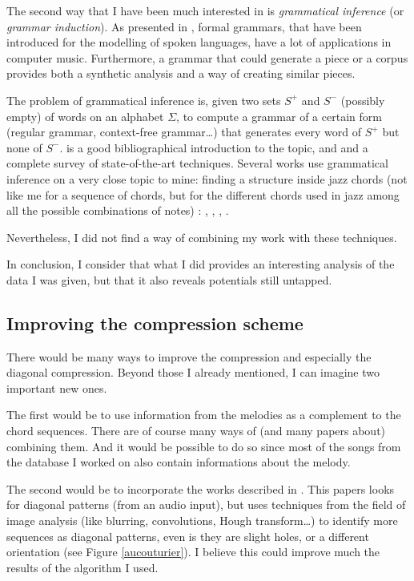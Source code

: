 \documentclass[a4paper,10pt]{article}
\begin{document}
The second way that I have been much interested in is \emph{grammatical inference} (or \emph{grammar induction}). As presented in \cite{goldabdallah}, formal grammars, that have been introduced for the modelling of spoken languages, have a lot of applications in computer music. Furthermore, a grammar that could generate a piece or a corpus provides both a synthetic analysis and a way of creating similar pieces.

The problem of grammatical inference is, given two sets $S^+$ and $S^-$ (possibly empty) of words on an alphabet $\Sigma$, to compute a grammar of a certain form (regular grammar, context-free grammar\dots) that generates every word of $S^+$ but none of $S^-$. \cite{bibliogrammar} is a good bibliographical introduction to the topic, and \cite{survey1} and \cite{survey2} a complete survey of state-of-the-art techniques. Several works use grammatical inference on a very close topic to mine: finding a structure inside jazz chords (not like me for a sequence of chords, but for the different chords used in jazz among all the possible combinations of notes) : \cite{jazzgrammar1}, \cite{jazzgrammar2}, \cite{jazzgrammar3}, \cite{jazzgrammar4}.

Nevertheless, I did not find a way of combining my work with these techniques.

In conclusion, I consider that what I did provides an interesting analysis of the data I was given, but that it also reveals potentials still untapped.


\subsection{Improving the compression scheme}

There would be many ways to improve the compression and especially the diagonal compression. Beyond those I already mentioned, I can imagine two important new ones.

The first would be to use information from the melodies as a complement to the chord sequences. There are of course many ways of (and many papers about) combining them. And it would be possible to do so since most of the songs from the database I worked on also contain informations about the melody.

The second would be to incorporate the works described in \cite{aucouturier2002finding}. This papers looks for diagonal patterns (from an audio input), but uses techniques from the field of image analysis (like blurring, convolutions, Hough transform\dots) to identify more sequences as diagonal patterns, even is they are slight holes, or a different orientation (see Figure \ref{aucouturier}). I believe this could improve much the results of the algorithm I used.
\end{document}
